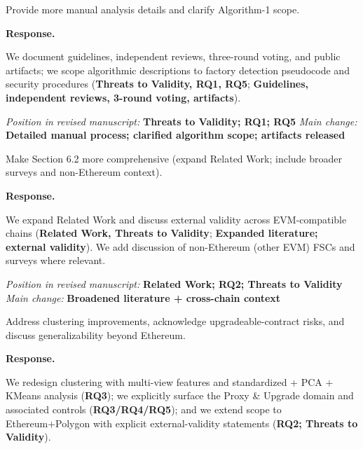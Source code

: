 \documentclass[acmsmall]{acmart}
\begin{document}
	\begin{tcolorbox}
		[commentbox,title=Editor/AE -- Comment 5] Provide more manual analysis details and clarify
		Algorithm-1 scope.
	\end{tcolorbox}

	\noindent
	\textbf{Response.}

	We document guidelines, independent reviews, three-round voting, and public artifacts; we scope
	algorithmic descriptions to factory detection pseudocode and security procedures ({\textbf{Threats to Validity, RQ1, RQ5}};
	{\textbf{Guidelines, independent reviews, 3-round voting, artifacts}}).

\vspace{0.25em}
\noindent\textit{Position in revised manuscript:} {\color{red}\textbf{Threats to Validity; RQ1; RQ5}}
\noindent\textit{Main change:} {\color{blue}\textbf{Detailed manual process; clarified algorithm scope; artifacts released}}

	\begin{tcolorbox}
		[commentbox,title=Editor/AE -- Comment 6] Make Section 6.2 more comprehensive (expand Related
		Work; include broader surveys and non-Ethereum context).
	\end{tcolorbox}

	\noindent
	\textbf{Response.}

	We expand Related Work and discuss external validity across EVM-compatible chains ({\textbf{Related Work, Threats to Validity}};
	{\textbf{Expanded literature; external validity}}). We add discussion of non-Ethereum (other EVM)
	FSCs and surveys where relevant.

\vspace{0.25em}
\noindent\textit{Position in revised manuscript:} {\color{red}\textbf{Related Work; RQ2; Threats to Validity}}
\noindent\textit{Main change:} {\color{blue}\textbf{Broadened literature + cross-chain context}}

	\begin{tcolorbox}
		[commentbox,title=Editor/AE -- Comment 7] Address clustering improvements, acknowledge upgradeable-contract
		risks, and discuss generalizability beyond Ethereum.
	\end{tcolorbox}

	\noindent
	\textbf{Response.}

	We redesign clustering with multi-view features and standardized + PCA + KMeans analysis ({\textbf{RQ3}});
	we explicitly surface the Proxy \& Upgrade domain and associated controls ({\textbf{RQ3/RQ4/RQ5}});
	and we extend scope to Ethereum+Polygon with explicit external-validity statements ({\textbf{RQ2; Threats to Validity}}).
\end{document}
